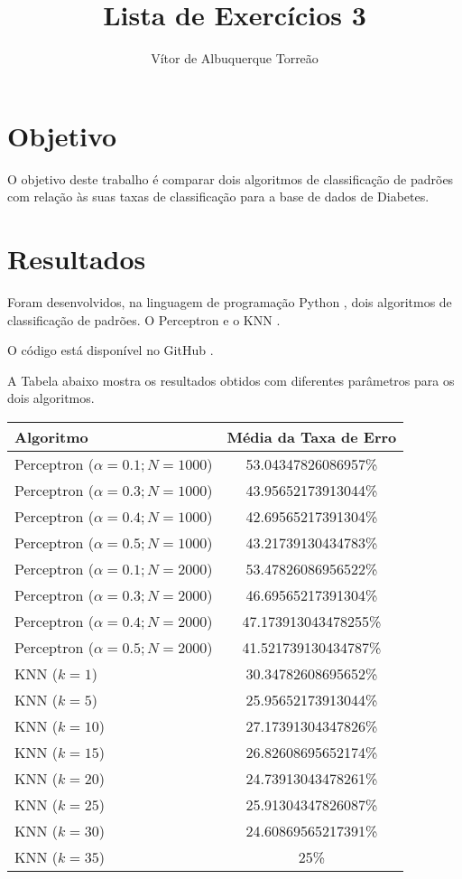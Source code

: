 \documentclass{article}
\begin{document}
	
\title{Lista de Exercícios 3}
\author{Vítor de Albuquerque Torreão}
	
\maketitle

\section*{Objetivo}

O objetivo deste trabalho é comparar dois algoritmos de classificação de padrões 
com relação às suas taxas de classificação para a base de dados de Diabetes.

\section*{Resultados}
Foram desenvolvidos, na linguagem de programação Python \cite{python.org}, dois 
algoritmos de classificação de padrões. O Perceptron \cite{perceptron} e o KNN 
\cite{knn}.

O código está disponível no GitHub \cite{git}.

A Tabela abaixo mostra os resultados obtidos com diferentes parâmetros 
para os dois algoritmos.

\begin{center}
	\begin{tabular}{| l | c |}
		\hline
		\textbf{Algoritmo} & \textbf{Média da Taxa de Erro} \\ \hline
		Perceptron ($\alpha = 0.1; N = 1000$) & 53.04347826086957\% \\ \hline
		Perceptron ($\alpha = 0.3; N = 1000$) & 43.95652173913044\% \\ \hline
		Perceptron ($\alpha = 0.4; N = 1000$) & 42.69565217391304\% \\ \hline
		Perceptron ($\alpha = 0.5; N = 1000$) & 43.21739130434783\% \\ \hline
		Perceptron ($\alpha = 0.1; N = 2000$) & 53.47826086956522\% \\ \hline
		Perceptron ($\alpha = 0.3; N = 2000$) & 46.69565217391304\% \\ \hline
		Perceptron ($\alpha = 0.4; N = 2000$) & 47.173913043478255\% \\ \hline
		Perceptron ($\alpha = 0.5; N = 2000$) & 41.521739130434787\% \\ \hline
		KNN ($k = 1$) & 30.34782608695652\% \\ \hline
		KNN ($k = 5$) & 25.95652173913044\% \\ \hline
		KNN ($k = 10$) & 27.17391304347826\% \\ \hline
		KNN ($k = 15$) & 26.82608695652174\% \\ \hline
		KNN ($k = 20$) & 24.73913043478261\% \\ \hline
		KNN ($k = 25$) & 25.91304347826087\% \\ \hline
		KNN ($k = 30$) & 24.60869565217391\% \\ \hline
		KNN ($k = 35$) & 25\% \\ \hline
	\end{tabular}
\end{center}
\end{document}
